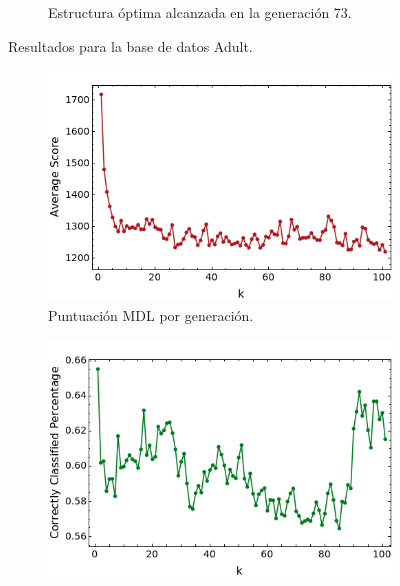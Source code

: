 \documentclass[10pt,a4paper]{article}
\begin{document}
\begin{figure}[htb!]
\begin{subfigure}[b]{0.475\textwidth}
            \caption[ ]{{Estructura óptima alcanzada en la generación 73.}}
        \end{subfigure}

\caption{Resultados para la base de datos Adult.}
\label{fig:adult_results}
\end{figure}

\begin{figure}[htb!]
          \begin{subfigure}[b]{0.48\textwidth}
            \centering 
            \includegraphics[width=\textwidth]{img/servo/ScoreVsK.png}
            \caption[ ]{{Puntuación MDL por generación.}}
          \end{subfigure}
                  \hfill
          \begin{subfigure}[b]{0.48\textwidth}
            \centering 
            \includegraphics[width=\textwidth]{img/servo/CorrectlyClassifiedVsK.png}

\end{subfigure}
\end{figure}
\end{document}
